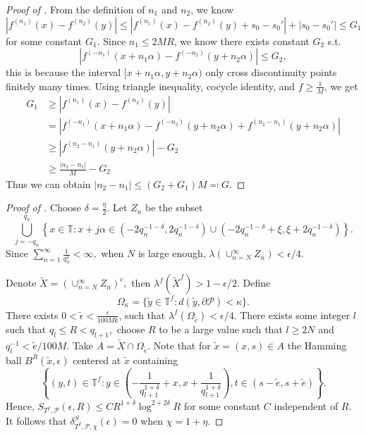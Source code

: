 \documentclass[oneside]{amsart}
\theoremstyle{plain}
\theoremstyle{definition}
\newcommand{\<}{\langle}
\renewcommand{\>}{\rangle}
\renewcommand{\P}{\mathcal{P}}
\newcommand{\e}{\epsilon}
\renewcommand{\|}{|\!|} %
\begin{document}
\begin{proof}[Proof of ]

 From the definition of  $n_1$ and $n_2$, we know 
 $$|f^{(n_1)}(x)-f^{(n_2)}(y)|\leq |f^{(n_1)}(x)-f^{(n_2)}(y)+s_0-s_0'|+|s_0-s_0'|\leq G_1$$ for some constant $G_1.$
 Since $n_1\leq 2M R$, we know there exists constant $G_2$ s.t. 
 $$|f^{(-n_1)}(x+n_1\alpha)-f^{(-n_2)}(y+n_2\alpha)|\leq G_2,$$ this is because the interval $[x+n_1\alpha,y+n_2\alpha)$ only cross discontinuity points finitely many times.
 Using triangle inequality, cocycle identity, and $f\geq \frac{1}{M}$, we get 
 \begin{equation}
   \begin{aligned}
        G_1&\geq|f^{(n_1)}(x)-f^{(n_2)}(y)|\\&=|f^{(-n_1)}(x+n_1\alpha)-f^{(-n_2)}(y+n_2\alpha)+f^{(n_2-n_1)}(y+n_2\alpha)|\\&\geq 
 |f^{(n_2-n_1)}(y+n_2\alpha)|-G_2\\
        &\geq \frac{|n_2-n_1|}{M}-G_2
   \end{aligned}
 \end{equation}
Thus we can obtain $|n_2-n_1|\leq (G_2+G_1)M \eqqcolon G$.
\end{proof}








\begin{proof}[Proof of ]
Choose \(\delta=\frac{\eta}{2}\).
Let $Z_n$ be the subset
\begin{equation*}
\displaystyle \bigcup_{j=-q_n}^{q_n}\left\{x\in\mathbb{T}: x+j\alpha \in (-2q_n^{-1-\delta},2q_n^{-1-\delta}) \cup (-2q_n^{-1-\delta}+\xi,\xi+2q_n^{-1-\delta})\right\}. 
\end{equation*}
Since \( \sum_{n=1}^{\infty} \frac{1}{q_n^{\delta}}<\infty,\) when \(N\) is large enough, \(\lambda\left(\displaystyle \cup_{n=N}^{\infty}Z_n \right)<\e/4.\)

Denote \(\tilde{X}=\left(\displaystyle \cup_{n=N}^{\infty}Z_n \right)^c,\) then \(\lambda^f \left(\tilde{X}^f \right)>1-\e/2\).  Define \[\Omega_{\kappa}=\{ \tilde{y}\in \mathbb{T}^f: d(\tilde{y}, \partial\P)<\kappa\}.\] There exists \(0<\tilde{\e}<\frac{\e}{100Mk}\), such that \(\lambda^f(\Omega_{\tilde{e}})<\e/4.\) 
There exists some integer \(l\) such that \(q_{l}\leq R <q_{l+1},\) choose \(R\) to be a large value such that \(l\geq 2N\) and \(q_{l}^{-1}<\tilde{e}/100M.\) Take \(A=\tilde{X}\cap \Omega_{\tilde{e}}.\) 
Note that for \(\tilde{x}=(x,s)\in A\) the Hamming ball \(B^R(\tilde{x},\e)\) centered at \(\tilde{x}\)  containing \[\left\{(y,t)\in \mathbb{T}^f: y\in \left(-\frac{1}{q_{l+1}^{1+\delta}}+x,x+\frac{1}{q_{l+1}^{1+\delta}}\right), t\in (s-\tilde{e},s+\tilde{e})\right\}.\] Hence, \(S_{T^f,\P}(\e,R)\leq C R^{1+\delta}\log^{2+2\delta} R\) for some constant \(C\) independent of \(R\). It follows that   \(\delta_{T^f,\P,\chi}^S (\e)=0\) when \(\chi=1+\eta.\)
\end{proof}






\end{document}

